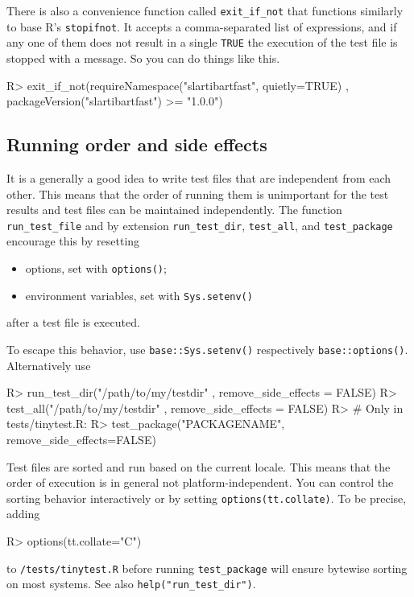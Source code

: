 \documentclass[11pt]{article}
\newcommand{\code}[1]{\texttt{#1}}
\begin{document}
There is also a convenience function called \code{exit\_if\_not} that functions
similarly to base R's \code{stopifnot}. It accepts a comma-separated list
of expressions, and if any one of them does not result in a single \code{TRUE}
the execution of the test file is stopped with a message. So you can
do things like this.
\begin{Schunk}
\begin{Sinput}
R>  exit_if_not(requireNamespace("slartibartfast", quietly=TRUE)
               , packageVersion("slartibartfast") >= "1.0.0")
\end{Sinput}
\end{Schunk}



\subsection{Running order and side effects}
\label{sect:running}
It is a generally a good idea to write test files that are independent from
each other.  This means that the order of running them is unimportant for the
test results and test files can be maintained independently. The function
\code{run\_test\_file} and by extension \code{run\_test\_dir},
\code{test\_all}, and \code{test\_package} encourage this by resetting
\begin{itemize}
\item options, set with \code{options()};
\item environment variables, set with \code{Sys.setenv()}
\end{itemize}
after a test file is executed. 


To escape this behavior, use \code{base::Sys.setenv()} respectively
\code{base::options()}. Alternatively use 
\begin{Schunk}
\begin{Sinput}
R>  run_test_dir("/path/to/my/testdir"
               , remove_side_effects = FALSE)
R>  test_all("/path/to/my/testdir"
               , remove_side_effects = FALSE)
R>  # Only in tests/tinytest.R:
R>  test_package("PACKAGENAME", remove_side_effects=FALSE)
\end{Sinput}
\end{Schunk}

Test files are sorted and run based on the current locale. This means
that the order of execution is in general not platform-independent.
You can control the sorting behavior interactively or by setting
\code{options(tt.collate)}. To be precise, adding 
\begin{Schunk}
\begin{Sinput}
R>  options(tt.collate="C")
\end{Sinput}
\end{Schunk}
to \code{/tests/tinytest.R} before running \code{test\_package} will
ensure bytewise sorting on most systems. See also
\code{help("run\_test\_dir")}.
\end{document}
